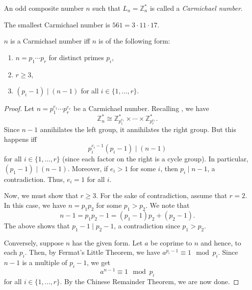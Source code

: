 \documentclass[12pt]{article}
\begin{document}
    \begin{defn}
        An odd composite number $n$ such that $L_{n} = \mathbb{Z}_{n}^{\ast}$ is called a \emph{Carmichael number}.
    \end{defn}
    
    \begin{ex}
        The smallest Carmichael number is $561 = 3 \cdot 11 \cdot 17.$
    \end{ex}
     
    \begin{thm}
        $n$ is a Carmichael number iff $n$ is of the following form:
        \begin{enumerate}
            \item $n = p_{1} \cdots p_{r}$ for distinct primes $p_{i}$,
            \item $r \ge 3$,
            \item $(p_{i} - 1) \mid (n - 1)$ for all $i \in \{1, \ldots, r\}$. 
        \end{enumerate}
    \end{thm}
    \begin{proof} 
        Let $n = p_{1}^{e_{1}} \cdots p_{r}^{e_{r}}$ be a Carmichael number. Recalling , we have
        \begin{equation*} 
            \mathbb{Z}_{n}^{\ast} \cong \mathbb{Z}_{p_{1}^{e_1}}^{\ast} \times \cdots \times \mathbb{Z}_{p_{r}^{e_{r}}}^{\ast}.
        \end{equation*}
        Since $n - 1$ annihilates the left group, it annihilates the right group. But this happens iff 
        \begin{equation*} 
            p_{i}^{e_{i} - 1}(p_{i} - 1) \mid (n - 1)
        \end{equation*} 
        for all $i \in \{1, \ldots, r\}$ (since each factor on the right is a cycle group). In particular, $(p_{1} - 1) \mid (n - 1)$. Moreover, if $e_{i} > 1$ for some $i$, then $p_{i} \mid n - 1$, a contradiction. Thus, $e_{i} = 1$ for all $i$.

        Now, we must show that $r \ge 3$. For the sake of contradiction, assume that $r = 2$. In this case, we have $n = p_{1} p_{2}$ for some $p_{1} > p_{2}$. We note that
        \begin{equation*} 
            n - 1 = p_{1} p_{2} - 1 = (p_{1} - 1) p_{2} + (p_{2} - 1).
        \end{equation*}
        The above shows that $p_{1} - 1 \mid p_{2} - 1$, a contradiction since $p_{1} > p_{2}$.

        Conversely, suppose $n$ has the given form. Let $a$ be coprime to $n$ and hence, to each $p_{i}$. Then, by Fermat's Little Theorem, we have $a^{p_{i} - 1} \equiv 1 \mod p_{i}$. Since $n - 1$ is a multiple of $p_{i} - 1$, we get
        \begin{equation*} 
            a^{n - 1} \equiv 1 \mod p_{i}
        \end{equation*}
        for all $i \in \{1, \ldots, r\}$. By the Chinese Remainder Theorem, we are now done.
    \end{proof}
\end{document}

